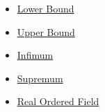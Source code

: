 \begin{dependencies}
\begin{itemize}
  \item \hyperref[def:lower-bound]{Lower Bound}
  \item \hyperref[def:upper-bound]{Upper Bound}
  \item \hyperref[def:infimum]{Infimum}
  \item \hyperref[def:supremum]{Supremum}
  \item \hyperref[def:real-ordered-field]{Real Ordered Field}
\end{itemize}
\end{dependencies}

\clearpage
